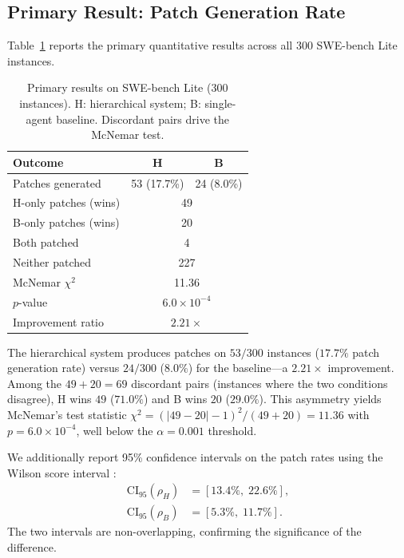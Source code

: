 
\subsection{Primary Result: Patch Generation Rate}
\label{sec:results:primary}

Table~\ref{tab:main_results} reports the primary quantitative results across
all 300 SWE-bench Lite instances.

\begin{table}[t]
\centering
\caption{Primary results on SWE-bench Lite (300 instances). H: hierarchical
system; B: single-agent baseline. Discordant pairs drive the McNemar test.}
\label{tab:main_results}
\begin{tabular}{lcc}
\toprule
\textbf{Outcome} & \textbf{H} & \textbf{B} \\
\midrule
Patches generated & 53 (17.7\%) & 24 (8.0\%) \\
\midrule
H-only patches (wins) & \multicolumn{2}{c}{49} \\
B-only patches (wins) & \multicolumn{2}{c}{20} \\
Both patched          & \multicolumn{2}{c}{4}  \\
Neither patched       & \multicolumn{2}{c}{227} \\
\midrule
McNemar $\chi^2$ & \multicolumn{2}{c}{11.36} \\
$p$-value         & \multicolumn{2}{c}{$6.0 \times 10^{-4}$} \\
Improvement ratio & \multicolumn{2}{c}{$2.21\times$} \\
\bottomrule
\end{tabular}
\end{table}

The hierarchical system produces patches on $53/300$ instances ($17.7\%$
patch generation rate) versus $24/300$ ($8.0\%$) for the baseline---a
$2.21\times$ improvement. Among the $49 + 20 = 69$ discordant pairs
(instances where the two conditions disagree), H wins $49$ ($71.0\%$) and B
wins $20$ ($29.0\%$). This asymmetry yields McNemar's test statistic
$\chi^2 = (|49 - 20| - 1)^2 / (49 + 20) = 11.36$ with $p = 6.0
\times 10^{-4}$, well below the $\alpha = 0.001$ threshold.

We additionally report 95\% confidence intervals on the patch rates using
the Wilson score interval \cite{wilson1927}:
\begin{align}
  \text{CI}_{95}(\rho_H) &= [13.4\%,\; 22.6\%], \\
  \text{CI}_{95}(\rho_B) &= [5.3\%,\; 11.7\%].
\end{align}
The two intervals are non-overlapping, confirming the significance of the
difference.

